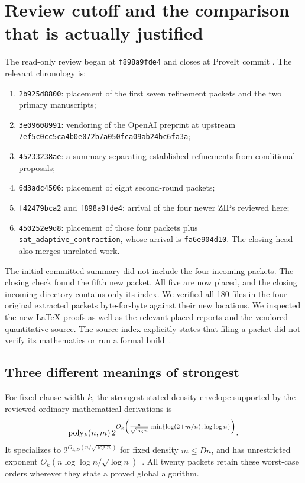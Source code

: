 \section{Review cutoff and the comparison that is actually justified}
\label{sec:review}
The read-only review began at \nolinkurl{f898a9fde4} and closes at ProveIt
commit \pin.
The relevant chronology is:
\begin{enumerate}
\item \nolinkurl{2b925d8800}: placement of the first seven refinement packets
and the two primary manuscripts;
\item \nolinkurl{3e09608991}: vendoring of the OpenAI preprint at upstream
\nolinkurl{7ef5c0cc5ca4b0e072b7a050fca09ab24bc6fa3a};
\item \nolinkurl{45233238ae}: a summary separating established refinements
from conditional proposals;
\item \nolinkurl{6d3adc4506}: placement of eight second-round packets;
\item \nolinkurl{f42479bca2} and \nolinkurl{f898a9fde4}: arrival of the four
newer ZIPs reviewed here;
\item \nolinkurl{450252e9d8}: placement of those four packets plus
\nolinkurl{sat_adaptive_contraction}, whose arrival is
\nolinkurl{fa6e904d10}. The closing head also merges unrelated work.
\end{enumerate}
The initial committed summary did not include the four incoming packets.
The closing check found the fifth new packet. All five are now placed,
and the closing incoming directory contains only its index. We verified
all 180 files in the four original extracted packets byte-for-byte against
their new locations. We inspected the new LaTeX proofs as well as the relevant
placed reports and the vendored quantitative source. The source index
explicitly states that filing a packet did not verify its mathematics
or run a formal build~\cite{index,commits,upstream}.

\subsection{Three different meanings of strongest}
For fixed clause width $k$, the strongest stated density envelope supported
by the reviewed ordinary mathematical derivations is
\begin{equation}\label{eq:density-envelope}
 \operatorname{poly}_k(n,m)\,
 2^{O_k\left(
 \frac{n}{\sqrt{\log n}}\,
 \min\{\log(2+m/n),\,\log\log n\}\right)}.
\end{equation}
It specializes to $2^{O_{k,D}(n/\sqrt{\log n})}$ for fixed density
$m\le Dn$, and has unrestricted exponent
$O_k(n\log\log n/\sqrt{\log n})$~\cite{density,density2}.
All twenty packets retain these worst-case orders wherever they state
a proved global algorithm.

